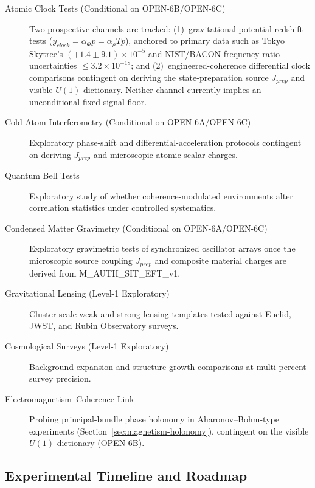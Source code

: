 \documentclass[american,11pt,letterpaper]{article}
\def\mathcal#1{#1}%
\def\mathrm#1{#1}%
\def\texttt#1{#1}%
\begin{document}
\begin{description}
    \item[Atomic Clock Tests (Conditional on \texttt{OPEN-6B}/\texttt{OPEN-6C})] Two prospective channels are tracked: (1)~gravitational-potential redshift tests ($y_{\mathrm{clock}} = \alpha_\Phi p = \alpha_\rho\mathcal{T} p$), anchored to primary data such as Tokyo Skytree's $(+1.4\pm 9.1)\times 10^{-5}$ and NIST/BACON frequency-ratio uncertainties $\le 3.2\times 10^{-18}$; and (2)~engineered-coherence differential clock comparisons contingent on deriving the state-preparation source $J_{\mathrm{prep}}$ and visible $U(1)$ dictionary. Neither channel currently implies an unconditional fixed signal floor.

    \item[Cold-Atom Interferometry (Conditional on \texttt{OPEN-6A}/\texttt{OPEN-6C})] Exploratory phase-shift and differential-acceleration protocols contingent on deriving $J_{\mathrm{prep}}$ and microscopic atomic scalar charges.

    \item[Quantum Bell Tests] Exploratory study of whether coherence-modulated environments alter correlation statistics under controlled systematics.

    \item[Condensed Matter Gravimetry (Conditional on \texttt{OPEN-6A}/\texttt{OPEN-6C})] Exploratory gravimetric tests of synchronized oscillator arrays once the microscopic source coupling $J_{\mathrm{prep}}$ and composite material charges are derived from \texttt{M\_AUTH\_SIT\_EFT\_v1}.

    \item[Gravitational Lensing (Level-1 Exploratory)] Cluster-scale weak and strong lensing templates tested against Euclid, JWST, and Rubin Observatory surveys.

    \item[Cosmological Surveys (Level-1 Exploratory)] Background expansion and structure-growth comparisons at multi-percent survey precision.

    \item[Electromagnetism--Coherence Link] Probing principal-bundle phase holonomy in Aharonov--Bohm-type experiments (Section~\ref{sec:magnetism-holonomy}), contingent on the visible $U(1)$ dictionary (\texttt{OPEN-6B}).
\end{description}

\subsection{Experimental Timeline and Roadmap}
\end{document}
